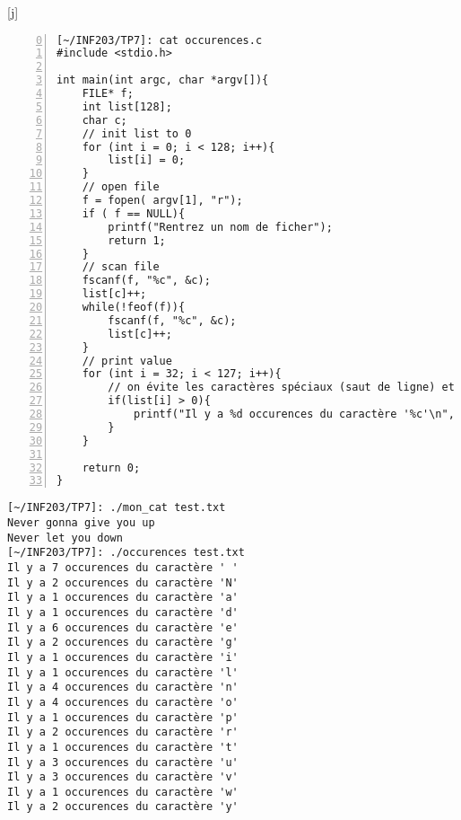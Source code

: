 \documentclass[12pt,a4paper,notitlepage,colorinlistoftodos]{article}
\begin{document}
[j]
\begin{lstlisting}[numbers=left, firstnumber = 0 ]
[~/INF203/TP7]: cat occurences.c
#include <stdio.h>

int main(int argc, char *argv[]){
    FILE* f;
    int list[128];
    char c;
    // init list to 0
    for (int i = 0; i < 128; i++){
        list[i] = 0;
    }
    // open file
    f = fopen( argv[1], "r");
    if ( f == NULL){
        printf("Rentrez un nom de ficher");
        return 1;
    }
    // scan file
    fscanf(f, "%c", &c);
    list[c]++;
    while(!feof(f)){
        fscanf(f, "%c", &c);
        list[c]++;
    }
    // print value
    for (int i = 32; i < 127; i++){ 
        // on évite les caractères spéciaux (saut de ligne) et DEL
        if(list[i] > 0){
            printf("Il y a %d occurences du caractère '%c'\n", list[i], i);
        }
    }
    
    return 0;
}
\end{lstlisting}

\begin{lstlisting}
[~/INF203/TP7]: ./mon_cat test.txt 
Never gonna give you up
Never let you down
[~/INF203/TP7]: ./occurences test.txt 
Il y a 7 occurences du caractère ' '
Il y a 2 occurences du caractère 'N'
Il y a 1 occurences du caractère 'a'
Il y a 1 occurences du caractère 'd'
Il y a 6 occurences du caractère 'e'
Il y a 2 occurences du caractère 'g'
Il y a 1 occurences du caractère 'i'
Il y a 1 occurences du caractère 'l'
Il y a 4 occurences du caractère 'n'
Il y a 4 occurences du caractère 'o'
Il y a 1 occurences du caractère 'p'
Il y a 2 occurences du caractère 'r'
Il y a 1 occurences du caractère 't'
Il y a 3 occurences du caractère 'u'
Il y a 3 occurences du caractère 'v'
Il y a 1 occurences du caractère 'w'
Il y a 2 occurences du caractère 'y'
\end{lstlisting}


\cite{}


\end{document}
